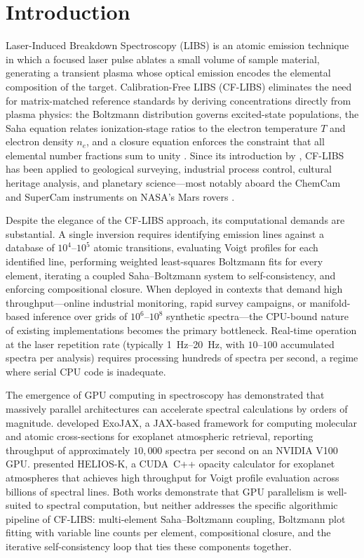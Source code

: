 \section{Introduction}
\label{sec:introduction}

Laser-Induced Breakdown Spectroscopy (LIBS) is an atomic emission technique in which a focused laser pulse ablates a small volume of sample material, generating a transient plasma whose optical emission encodes the elemental composition of the target.
Calibration-Free LIBS (CF-LIBS) eliminates the need for matrix-matched reference standards by deriving concentrations directly from plasma physics: the Boltzmann distribution governs excited-state populations, the Saha equation relates ionization-stage ratios to the electron temperature $T$ and electron density $n_e$, and a closure equation enforces the constraint that all elemental number fractions sum to unity \citep{Tognoni2010}.
Since its introduction by \citet{Ciucci1999}, CF-LIBS has been applied to geological surveying, industrial process control, cultural heritage analysis, and planetary science---most notably aboard the ChemCam and SuperCam instruments on NASA's Mars rovers \citep{Wiens2013,Maurice2021}.

Despite the elegance of the CF-LIBS approach, its computational demands are substantial.
A single inversion requires identifying emission lines against a database of $10^4$--$10^5$ atomic transitions, evaluating Voigt profiles for each identified line, performing weighted least-squares Boltzmann fits for every element, iterating a coupled Saha--Boltzmann system to self-consistency, and enforcing compositional closure.
When deployed in contexts that demand high throughput---online industrial monitoring, rapid survey campaigns, or manifold-based inference over grids of $10^6$--$10^8$ synthetic spectra---the CPU-bound nature of existing implementations becomes the primary bottleneck.
Real-time operation at the laser repetition rate (typically \SIrange{1}{20}{\hertz}, with $10$--$100$ accumulated spectra per analysis) requires processing hundreds of spectra per second, a regime where serial CPU code is inadequate.

The emergence of GPU computing in spectroscopy has demonstrated that massively parallel architectures can accelerate spectral calculations by orders of magnitude.
\citet{Kawahara2022} developed ExoJAX, a JAX-based framework for computing molecular and atomic cross-sections for exoplanet atmospheric retrieval, reporting throughput of approximately $10{,}000$ spectra per second on an NVIDIA V100 GPU.
\citet{Grimm2021} presented HELIOS-K, a CUDA~C++ opacity calculator for exoplanet atmospheres that achieves high throughput for Voigt profile evaluation across billions of spectral lines.
Both works demonstrate that GPU parallelism is well-suited to spectral computation, but neither addresses the specific algorithmic pipeline of CF-LIBS: multi-element Saha--Boltzmann coupling, Boltzmann plot fitting with variable line counts per element, compositional closure, and the iterative self-consistency loop that ties these components together.

